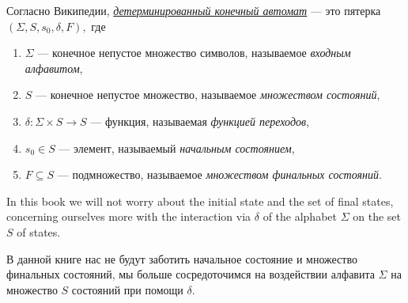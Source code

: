 \documentclass[../main/CT4S-EN-RU]{subfiles}
\begin{document}
\begin{blockRUS}
Согласно Википедии, \href{https://ru.wikipedia.org/wiki/%D0%9A%D0%BE%D0%BD%D0%B5%D1%87%D0%BD%D1%8B%D0%B9_%D0%B0%D0%B2%D1%82%D0%BE%D0%BC%D0%B0%D1%82#.D0.94.D0.B5.D1.82.D0.B5.D1.80.D0.BC.D0.B8.D0.BD.D0.B8.D1.80.D0.BE.D0.B2.D0.B0.D0.BD.D0.BD.D0.BE.D1.81.D1.82.D1.8C}{\em детерминированный конечный автомат} — это пятерка $({Σ},S,s_0,\delta,F),$ где
\begin{enumerate}
\item ${Σ}$ — конечное непустое множество символов, называемое {\em входным алфавитом},
\item $S$ — конечное непустое множество, называемое {\em множеством состояний},
\item $\delta\colon {Σ}\times S{→} S$ — функция, называемая {\em функцией переходов},
\item $s_0\in S$ — элемент, называемый {\em начальным состоянием},
\item $F\subseteq S$ — подмножество, называемое {\em множеством финальных состояний}.
\end{enumerate}
\end{blockRUS}

\begin{blockENG}
In this book we will not worry about the initial state and the set of final states, concerning ourselves more with the interaction via $\delta$ of the alphabet ${Σ}$ on the set $S$ of states.
\end{blockENG}

\begin{blockRUS}
В данной книге нас не будут заботить начальное состояние и множество финальных состояний, мы больше сосредоточимся на воздействии алфавита ${Σ}$ на множество $S$ состояний при помощи $\delta$.
\end{blockRUS}
\end{document}
